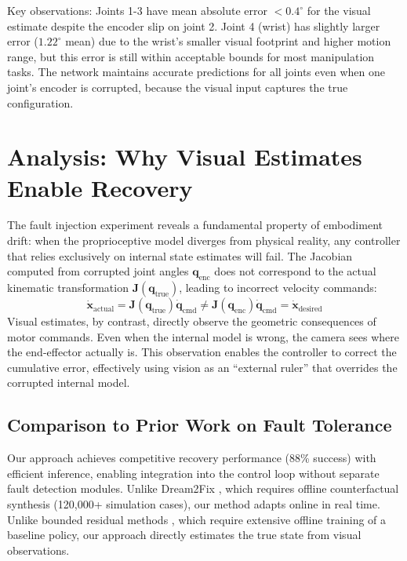 \documentclass[12pt,a4paper,oneside]{report}
\begin{document}
Key observations: Joints 1-3 have mean absolute error $<0.4^\circ$ for the visual estimate despite the encoder slip on joint 2. Joint 4 (wrist) has slightly larger error ($1.22^\circ$ mean) due to the wrist's smaller visual footprint and higher motion range, but this error is still within acceptable bounds for most manipulation tasks. The network maintains accurate predictions for all joints even when one joint's encoder is corrupted, because the visual input captures the true configuration.

\section{Analysis: Why Visual Estimates Enable Recovery}

The fault injection experiment reveals a fundamental property of embodiment drift: when the proprioceptive model diverges from physical reality, any controller that relies exclusively on internal state estimates will fail. The Jacobian computed from corrupted joint angles $\mathbf{q}_{\text{enc}}$ does not correspond to the actual kinematic transformation $\mathbf{J}(\mathbf{q}_{\text{true}})$, leading to incorrect velocity commands:
\begin{equation}
\dot{\mathbf{x}}_{\text{actual}} = \mathbf{J}(\mathbf{q}_{\text{true}}) \dot{\mathbf{q}}_{\text{cmd}} \neq \mathbf{J}(\mathbf{q}_{\text{enc}}) \dot{\mathbf{q}}_{\text{cmd}} = \dot{\mathbf{x}}_{\text{desired}}
\end{equation}
Visual estimates, by contrast, directly observe the geometric consequences of motor commands. Even when the internal model is wrong, the camera sees where the end-effector actually is. This observation enables the controller to correct the cumulative error, effectively using vision as an ``external ruler'' that overrides the corrupted internal model.

\subsection{Comparison to Prior Work on Fault Tolerance}

Our approach achieves competitive recovery performance (88\% success) with efficient inference, enabling integration into the control loop without separate fault detection modules. Unlike Dream2Fix \cite{li2025dream2fix}, which requires offline counterfactual synthesis (120,000+ simulation cases), our method adapts online in real time. Unlike bounded residual methods \cite{jayasinghe2026residual}, which require extensive offline training of a baseline policy, our approach directly estimates the true state from visual observations.
\end{document}
